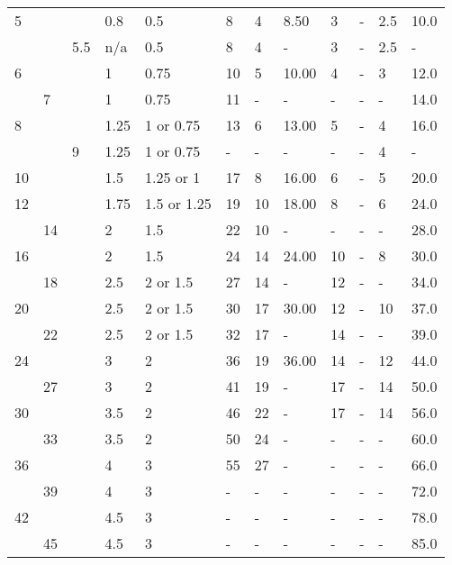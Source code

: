 \begin{table}[h!]
\begin{longtable}{lll|ll|llllll|l}
    5   &    &    &0.8  &0.5        &8   &4      &8.50   &3      &- &2.5  &10.0  \\
        &    &5.5 &n/a  &0.5        &8   &4      &-      &3      &- &2.5  &-     \\
    6   &    &    &1    &0.75       &10  &5      &10.00  &4      &- &3    &12.0  \\
        &7   &    &1    &0.75       &11  &-      &-      &-      &- &-    &14.0  \\
    8   &    &    &1.25 &1 or 0.75  &13  &6      &13.00  &5      &- &4    &16.0  \\
        &    &9   &1.25 &1 or 0.75  &-   &-      &-      &-      &- &4    &-     \\
    10  &    &    &1.5  &1.25 or 1  &17  &8      &16.00  &6      &- &5    &20.0  \\
    12  &    &    &1.75 &1.5 or 1.25&19  &10     &18.00  &8      &- &6    &24.0  \\
        &14  &    &2    &1.5        &22  &10     &-      &-      &- &-    &28.0  \\
    16  &    &    &2    &1.5        &24  &14     &24.00  &10     &- &8    &30.0  \\
        &18  &    &2.5  &2 or 1.5   &27  &14     &-      &12     &- &-    &34.0  \\
    20  &    &    &2.5  &2 or 1.5   &30  &17     &30.00  &12     &- &10   &37.0  \\
        &22  &    &2.5  &2 or 1.5   &32  &17     &-      &14     &- &-    &39.0  \\
    24  &    &    &3    &2          &36  &19     &36.00  &14     &- &12   &44.0  \\
        &27  &    &3    &2          &41  &19     &-      &17     &- &14   &50.0  \\
    30  &    &    &3.5  &2          &46  &22     &-      &17     &- &14   &56.0  \\
        &33  &    &3.5  &2          &50  &24     &-      &-      &- &-    &60.0  \\
    36  &    &    &4    &3          &55  &27     &-      &-      &- &-    &66.0  \\
        &39  &    &4    &3          &-   &-      &-      &-      &- &-    &72.0  \\
    42  &    &    &4.5  &3          &-   &-      &-      &-      &- &-    &78.0  \\
        &45  &    &4.5  &3          &-   &-      &-      &-      &- &-    &85.0  \\

\end{longtable}
\end{table}
